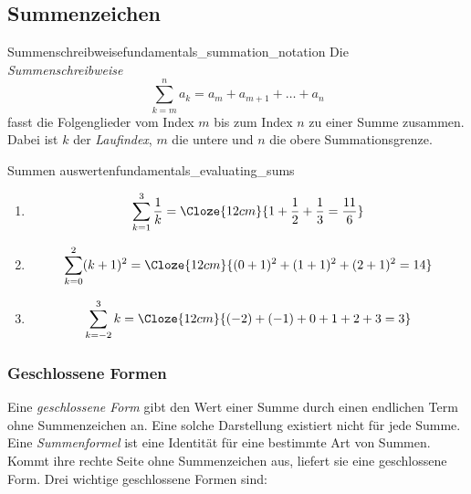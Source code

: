 \subsection{Summenzeichen}
\label{subsec:fundamentals_summation_notation}

\begin{DefinitionBox}{Summenschreibweise}{fundamentals_summation_notation}
  Die \emph{Summenschreibweise} 
  \[
    \sum_{k=m}^{n}a_k
      =a_m+a_{m+1}+\dots+a_n
  \]
  fasst die Folgenglieder vom Index $m$ bis zum Index $n$ zu einer Summe
  zusammen. Dabei ist $k$ der \emph{Laufindex}, $m$ die untere und $n$ die
  obere Summationsgrenze.
\end{DefinitionBox}

\begin{ExampleBox}{Summen auswerten}{fundamentals_evaluating_sums}
  \begin{enumerate}[label=\alph*),leftmargin=2em,itemsep=0.8em]
    \item\leavevmode
      \[
        \sum_{k=1}^{3}\frac1k
          =\Cloze{12cm}{1+\frac12+\frac13=\frac{11}{6}}
      \]
    \item\leavevmode
      \[
        \sum_{k=0}^{2}(k+1)^2
          =\Cloze{12cm}{(0+1)^2+(1+1)^2+(2+1)^2=14}
      \]
    \item\leavevmode
      \[
        \sum_{k=-2}^{3}k
          =\Cloze{12cm}{(-2)+(-1)+0+1+2+3=3}
      \]
  \end{enumerate}
\end{ExampleBox}



\subsubsection{Geschlossene Formen}
\label{subsubsec:fundamentals_closed_forms}

Eine \emph{geschlossene Form} gibt den Wert einer Summe durch einen endlichen
Term ohne Summenzeichen an. Eine solche Darstellung existiert nicht für jede
Summe. Eine \emph{Summenformel} ist eine Identität für eine bestimmte Art von
Summen. Kommt ihre rechte Seite ohne Summenzeichen aus, liefert sie eine
geschlossene Form. Drei wichtige geschlossene Formen sind:

